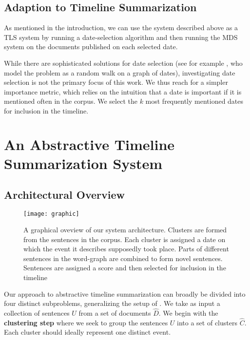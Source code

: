 \documentclass[a4paper,BCOR=10mm]{report}
\numberwithin{lemma}{chapter}
\numberwithin{definition}{chapter}
\begin{document}
\section{Adaption to Timeline Summarization}

As mentioned in the introduction, we can use the system described above as a TLS system by running a date-selection algorithm and then running the MDS system on the documents published on each selected date.

While there are sophisticated solutions for date selection (see for example \citet{tran-datesel}, who model the problem as a random walk on a graph of dates), investigating date selection is not the primary focus of this work.
We thus reach for a simpler importance metric, which relies on the intuition that a date is important if it is mentioned often in the corpus. We select the $k$ most frequently mentioned dates for inclusion in the timeline.


\chapter{An Abstractive Timeline Summarization System} \label{sec:system}

\section{Architectural Overview}

\begin{figure}
\texttt{[image: graphic]}
\caption{A graphical oveview of our system architecture. Clusters are formed from the sentences in the corpus. Each cluster is assigned a date on which the event it describes supposedly took place. Parts of different sentences in the word-graph are combined to form novel sentences. Sentences are assigned a score and then selected for inclusion in the timeline}
\label{fig:arch-overview}
\end{figure}

Our approach to abstractive timeline summarization can broadly be divided into four distinct subproblems, generalizing the setup of \citet{banerjee}.
We take as input a collection of sentences $U$ from a set of documents $\widehat{D}$.
We begin with the \textbf{clustering step} where we seek to group the sentences $U$ into a set of clusters $\widehat{C}$. Each cluster should ideally represent one distinct event.
\end{document}
